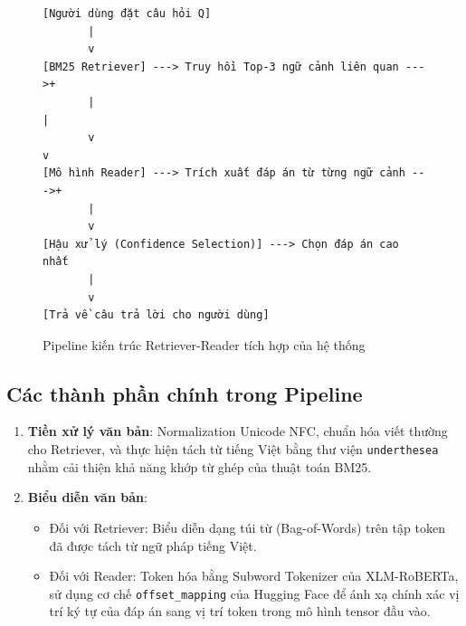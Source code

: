 \documentclass[12pt, a4paper]{article}
\begin{document}
\begin{figure}[H]
\centering
\small
\begin{verbatim}
[Người dùng đặt câu hỏi Q] 
       |
       v
[BM25 Retriever] ---> Truy hồi Top-3 ngữ cảnh liên quan --->+
       |                                                    |
       v                                                    v
[Mô hình Reader] ---> Trích xuất đáp án từ từng ngữ cảnh --->+
       |
       v
[Hậu xử lý (Confidence Selection)] ---> Chọn đáp án cao nhất 
       |
       v
[Trả về câu trả lời cho người dùng]
\end{verbatim}
\caption{Pipeline kiến trúc Retriever-Reader tích hợp của hệ thống}
\label{fig:pipeline}
\end{figure}

\subsection{Các thành phần chính trong Pipeline}
\begin{enumerate}
    \item \textbf{Tiền xử lý văn bản}: Normalization Unicode NFC, chuẩn hóa viết thường cho Retriever, và thực hiện tách từ tiếng Việt bằng thư viện \texttt{underthesea} nhằm cải thiện khả năng khớp từ ghép của thuật toán BM25.
    \item \textbf{Biểu diễn văn bản}:
    \begin{itemize}
        \item Đối với Retriever: Biểu diễn dạng túi từ (Bag-of-Words) trên tập token đã được tách từ ngữ pháp tiếng Việt.
        \item Đối với Reader: Token hóa bằng Subword Tokenizer của XLM-RoBERTa, sử dụng cơ chế \texttt{offset\_mapping} của Hugging Face để ánh xạ chính xác vị trí ký tự của đáp án sang vị trí token trong mô hình tensor đầu vào.
    \end{itemize}
\end{enumerate}
\end{document}
